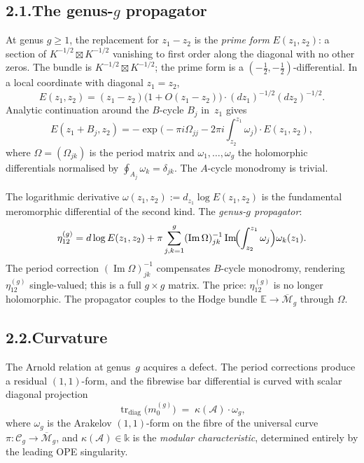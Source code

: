 \documentclass[11pt]{report}
\theoremstyle{definition}
\theoremstyle{remark}
\providecommand{\cA}{\mathcal{A}}
\providecommand{\Bbbk}{\mathbb{k}}
\numberwithin{equation}{section}
\begin{document}
\subsection*{2.1.\enspace The genus-$g$ propagator}

At genus $g\ge 1$, the replacement for $z_1-z_2$ is the \emph{prime
form} $E(z_1,z_2)$: a section of $K^{-1/2}\boxtimes K^{-1/2}$
vanishing to first order along the diagonal with no other zeros. The
bundle is $K^{-1/2}\boxtimes K^{-1/2}$; the prime form is a
$(-\tfrac12,-\tfrac12)$-differential. In a local coordinate with
diagonal $z_1=z_2$,
\[
E(z_1,z_2)=(z_1-z_2)\bigl(1+O(z_1-z_2)\bigr)\cdot(dz_1)^{-1/2}(dz_2)^{-1/2}.
\]
Analytic continuation around the $B$-cycle $B_j$ in~$z_1$ gives
\[
E(z_1+B_j,z_2)=-\exp\bigl(-\pi i\Omega_{jj}-2\pi i\textstyle\int_{z_2}^{z_1}\omega_j\bigr)\cdot E(z_1,z_2),
\]
where $\Omega=(\Omega_{jk})$ is the period matrix and
$\omega_1,\ldots,\omega_g$ the holomorphic differentials normalised by
$\oint_{A_j}\omega_k=\delta_{jk}$. The $A$-cycle monodromy is trivial.

The logarithmic derivative
$\omega(z_1,z_2):=d_{z_1}\log E(z_1,z_2)$ is the fundamental
meromorphic differential of the second kind. The \emph{genus-$g$
propagator}:
\[
\eta^{(g)}_{12}=d\log E(z_1,z_2)+\pi\sum_{j,k=1}^g(\operatorname{Im}\Omega)^{-1}_{jk}\operatorname{Im}\!\Bigl(\int_{z_2}^{z_1}\omega_j\Bigr)\omega_k(z_1).
\]
The period correction $(\operatorname{Im}\Omega)^{-1}_{jk}$ compensates
$B$-cycle monodromy, rendering $\eta^{(g)}_{12}$ single-valued; this
is a full $g\times g$ matrix. The price:
$\eta^{(g)}_{12}$ is no longer holomorphic. The propagator couples to
the Hodge bundle $\mathbb E\to\overline{\mathcal M}_g$ through
$\Omega$.

\subsection*{2.2.\enspace Curvature}

The Arnold relation at genus~$g$ acquires a defect. The period
corrections produce a residual $(1,1)$-form, and the fibrewise bar
differential is curved with scalar diagonal projection
\begin{equation}\label{eq:pref-curvature}
\operatorname{tr}_{\mathrm{diag}}\!\bigl(m_0^{(g)}\bigr)
\;=\;\kappa(\cA)\cdot\omega_g,
\end{equation}
where $\omega_g$ is the Arakelov $(1,1)$-form on the fibre of the
universal curve $\pi\colon\mathcal C_g\to\overline{\mathcal M}_g$, and
$\kappa(\cA)\in\Bbbk$ is the \emph{modular characteristic}, determined
entirely by the leading OPE singularity.
\end{document}
